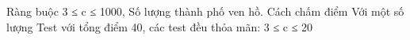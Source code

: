 Ràng buộc
3 ≤ c ≤ 1000, Số lượng thành phố ven hồ.
Cách chấm điểm
Với một số lượng Test với tổng điểm 40, các test đều thỏa mãn: 3 ≤ c ≤ 20